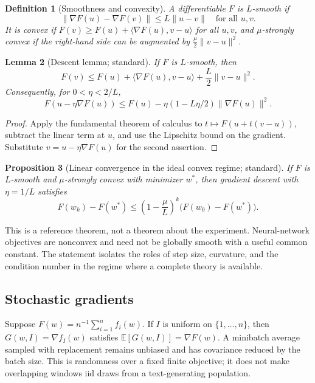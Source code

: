 \documentclass[11pt]{article}
\newtheorem{definition}{Definition}[section]
\newtheorem{proposition}[definition]{Proposition}
\newtheorem{lemma}[definition]{Lemma}
\newcommand{\E}{\mathbb E}
\newcommand{\1}{\mathbf 1}
\begin{document}
\begin{definition}[Smoothness and convexity]
A differentiable $F$ is $L$-smooth if
\[
 \|\nabla F(u)-\nabla F(v)\|\le L\|u-v\|
 \quad\text{for all }u,v.
\]
It is convex if
$F(v)\ge F(u)+\langle\nabla F(u),v-u\rangle$ for all $u,v$, and
$\mu$-strongly convex if the right-hand side can be augmented by
$\frac\mu2\|v-u\|^2$.
\end{definition}

\begin{lemma}[Descent lemma; standard]
If $F$ is $L$-smooth, then
\[
 F(v)\le F(u)+\langle\nabla F(u),v-u\rangle
 +\frac L2\|v-u\|^2.
\]
Consequently, for $0<\eta<2/L$,
\[
 F(u-\eta\nabla F(u))
 \le F(u)-\eta(1-L\eta/2)\|\nabla F(u)\|^2.
\]
\end{lemma}

\begin{proof}
Apply the fundamental theorem of calculus to
$t\mapsto F(u+t(v-u))$, subtract the linear term at $u$, and use the
Lipschitz bound on the gradient. Substitute $v=u-\eta\nabla F(u)$ for the
second assertion.
\end{proof}

\begin{proposition}[Linear convergence in the ideal convex regime; standard]
If $F$ is $L$-smooth and $\mu$-strongly convex with minimizer $w^*$, then
gradient descent with $\eta=1/L$ satisfies
\[
 F(w_k)-F(w^*)\le
 \left(1-\frac\mu L\right)^k
 \bigl(F(w_0)-F(w^*)\bigr).
\]
\end{proposition}

This is a reference theorem, not a theorem about the experiment. Neural-network
objectives are nonconvex and need not be globally smooth with a useful common
constant. The statement isolates the roles of step size, curvature, and the
condition number in the regime where a complete theory is available.

\subsection{Stochastic gradients}

Suppose $F(w)=n^{-1}\sum_{i=1}^nf_i(w)$. If $I$ is uniform on
$\{1,\ldots,n\}$, then $G(w,I)=\nabla f_I(w)$ satisfies
$\E[G(w,I)]=\nabla F(w)$. A minibatch average sampled with replacement remains
unbiased and has covariance reduced by the batch size. This is randomness over
a fixed finite objective; it does not make overlapping windows iid draws from
a text-generating population.
\end{document}
